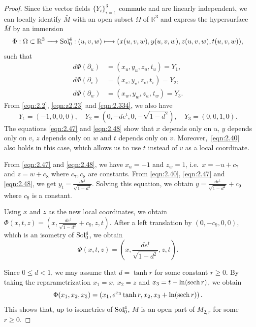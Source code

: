 \documentclass[reqno]{amsart}%
\theoremstyle{definition}
\numberwithin{equation}{section}
\begin{document}
\begin{proof}
		Since the vector fields $\{Y_i\}_{i=1}^3$ commute and are linearly independent, we can locally identify $\bar{M}$ with an open subset $\Omega$ of $\mathbb{R}^3$
		and express the hypersurface $\bar{M}$ by an immersion
		\begin{equation*}
			\Phi:\Omega\subset\mathbb{R}^3 \longrightarrow {\rm Sol_0^4}:
			(u,v,w) \longmapsto (x(u,v,w),y(u,v,w),z(u,v,w),t(u,v,w)),
		\end{equation*}
		such that
		\begin{equation}\label{eqn:2.47}
			\begin{aligned}
				d\Phi(\partial_u)
				&=(x_u,y_u,
				z_u,t_u)
				=Y_1,\\
				d\Phi(\partial_v)
				&=(x_v,y_v,
				z_v,t_v)
				=Y_2,\\
				d\Phi(\partial_w)
				&=(x_w,y_w,
				z_w,t_w)
				=Y_3.
			\end{aligned}
		\end{equation}
		From \eqref{eqn:2.2}, \eqref{eqn:z2.23} and \eqref{eqn:2.334}, we also have
		\begin{equation}\label{eqn:2.48}
			Y_1 =(-1,0,0,0),\quad
			Y_2 =\left(0,-de^t,0,-\sqrt{1-d^2} \right),\quad
			Y_3 =(0,0,1,0).
		\end{equation}
		The equations \eqref{eqn:2.47} and \eqref{eqn:2.48} show that
		$x$ depends only on $u$, $y$ depends only on $v$,
		$z$ depends only on $w$ and $t$ depends only on $v$.
		Moreover,~\eqref{eqn:2.40} also holds in this case, which allows us to use $t$ instead of $v$ as a local coordinate.
		
		From \eqref{eqn:2.47} and \eqref{eqn:2.48}, we have
		$x_u=-1$ and $z_w=1$, i.e.\
		$x=-u+c_7$ and $z=w+c_{8}$
		where $c_7, c_8$ are constants.
		From \eqref{eqn:2.40}, \eqref{eqn:2.47} and \eqref{eqn:2.48},
		we get $y_t=\tfrac{de^t}{\sqrt{1-d^2}}$.
		Solving this equation, we obtain
		$y=\tfrac{de^t}{\sqrt{1-d^2}}+c_{9}$
		where $c_{9}$ is a constant.
		
		Using $x$ and $z$ as the new local coordinates, we obtain
		$\Phi(x,t,z) = (x,\tfrac{de^t}{\sqrt{1-d^2}}+c_{9},z,t)$.
		After a left translation by $(0,-c_{9},0,0)$,
		which is an isometry of ${\rm Sol_0^4}$, we obtain
		\begin{equation}\label{eqn:9.70}
			\Phi(x,t,z)=\left(x,\frac{de^t}{\sqrt{1-d^2}},z,t\right).
		\end{equation}
		
		Since $0\leq d<1$, we may assume that $d=\tanh r$ for some constant $r\geq0$.
		By taking the reparametrization $x_1=x$, $x_2=z$ and
		$x_3=t-\ln({\rm sech}\, r)$, we obtain
		$$
		\Phi(x_1,x_2,x_3)=\left(x_1,e^{x_3}\tanh r,x_2,x_3+\ln ({\rm sech}\, r)\right).
		$$
		This shows that, up to isometries of ${\rm Sol_0^4}$,
		$M$ is an open part of $M_{2,r}$ for some $r\geq0$.
	\end{proof}
	
\end{document}
